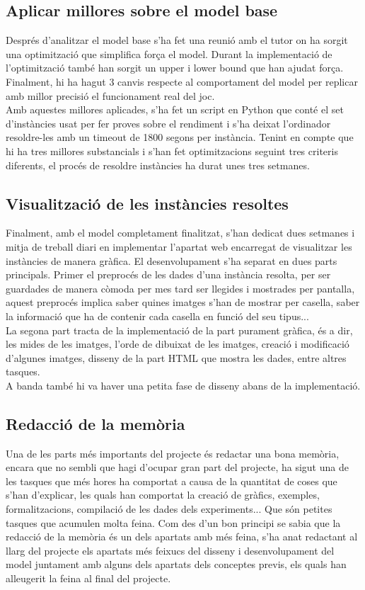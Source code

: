 \subsection{Aplicar millores sobre el model base}
Després d'analitzar el model base s'ha fet una reunió amb el tutor on ha sorgit una optimització que simplifica força el model. Durant la implementació de l'optimització també han sorgit un upper i lower bound que han ajudat força. Finalment, hi ha hagut 3 canvis respecte al comportament del model per replicar amb millor precisió el funcionament real del joc.\\
Amb aquestes millores aplicades, s'ha fet un script en Python que conté el set d'instàncies usat per fer proves sobre el rendiment i s'ha deixat l'ordinador resoldre-les amb un timeout de 1800 segons per instància. Tenint en compte que hi ha tres millores substancials i s'han fet optimitzacions seguint tres criteris diferents, el procés de resoldre instàncies ha durat unes tres setmanes.

\subsection{Visualització de les instàncies resoltes}
Finalment, amb el model completament finalitzat, s'han dedicat dues setmanes i mitja de treball diari en implementar l'apartat web encarregat de visualitzar les instàncies de manera gràfica. El desenvolupament s'ha separat en dues parts principals. Primer el preprocés de les dades d'una instància resolta, per ser guardades de manera còmoda per mes tard ser llegides i mostrades per pantalla, aquest preprocés implica saber quines imatges s'han de mostrar per casella, saber la informació que ha de contenir cada casella en funció del seu tipus...\\
La segona part tracta de la implementació de la part purament gràfica, és a dir, les mides de les imatges, l'orde de dibuixat de les imatges, creació i modificació d'algunes imatges, disseny de la part HTML que mostra les dades, entre altres tasques.\\
A banda també hi va haver una petita fase de disseny abans de la implementació.

\subsection{Redacció de la memòria}
Una de les parts més importants del projecte és redactar una bona memòria, encara que no sembli que hagi d'ocupar gran part del projecte, ha sigut una de les tasques que més hores ha comportat a causa de la quantitat de coses que s'han d'explicar, les quals han comportat la creació de gràfics, exemples, formalitzacions, compilació de les dades dels experiments... Que són petites tasques que acumulen molta feina. Com des d'un bon principi se sabia que la redacció de la memòria és un dels apartats amb més feina, s'ha anat redactant al llarg del projecte els apartats més feixucs del disseny i desenvolupament del model juntament amb alguns dels apartats dels conceptes previs, els quals han alleugerit la feina al final del projecte.\\

